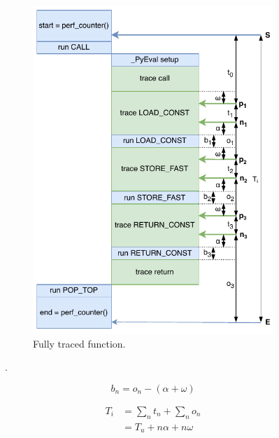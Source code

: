 \begin{figure}[H]
\begin{subfigure}[b]{0.45\textwidth}
       \includegraphics[width=\textwidth]{images/profiling_bytecode/traced_run.drawio.pdf}
       \caption{Fully traced function.}
       \label{figure:profiler-traced-run}
    \end{subfigure}
    \caption{.}
    \label{figure:profiler-run}
\end{figure}


\begin{equation}
    \label{eq:1}
    b_n = o_n - (\alpha + \omega)
\end{equation}

\begin{equation}
    \label{eq:2}
    \begin{split}
        T_i &= \sum_{n} t_n + \sum_{n} o_n \\
            &= T_u + n \alpha + n \omega
    \end{split}
\end{equation}

